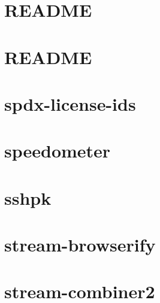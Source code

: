 \documentclass[twoside]{book}
\newcommand{\+}{\discretionary{\mbox{\scriptsize$\hookleftarrow$}}{}{}}
\begin{document}
\chapter{R\+E\+A\+D\+ME}
\label{md_dsmacc_examples_DRmerge_node_modules_spdx-exceptions_README}

\chapter{R\+E\+A\+D\+ME}
\label{md_dsmacc_examples_DRmerge_node_modules_spdx-expression-parse_README}

\chapter{spdx-\/license-\/ids}
\label{md_dsmacc_examples_DRmerge_node_modules_spdx-license-ids_README}

\chapter{speedometer}
\label{md_dsmacc_examples_DRmerge_node_modules_speedometer_README}

\chapter{sshpk}
\label{md_dsmacc_examples_DRmerge_node_modules_sshpk_README}

\chapter{stream-\/browserify}
\label{md_dsmacc_examples_DRmerge_node_modules_stream-browserify_readme}

\chapter{stream-\/combiner2}
\label{md_dsmacc_examples_DRmerge_node_modules_stream-combiner2_README}

\end{document}
